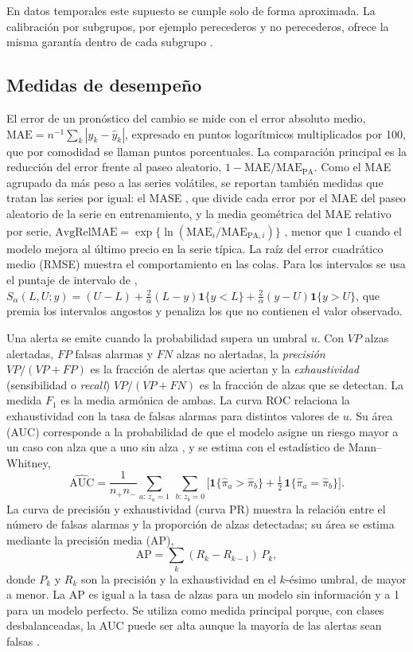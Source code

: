 En datos temporales este supuesto se cumple solo de forma aproximada. La calibración por subgrupos, por ejemplo perecederos y no perecederos, ofrece la misma garantía dentro de cada subgrupo \citep{angelopoulos2023}.

\subsection{Medidas de desempeño}
\label{sec:metricas}

El error de un pronóstico del cambio se mide con el error absoluto medio, $\mathrm{MAE}=n^{-1}\sum_k|y_k-\hat y_k|$, expresado en puntos logarítmicos multiplicados por 100, que por comodidad se llaman puntos porcentuales. La comparación principal es la reducción del error frente al paseo aleatorio, $1-\mathrm{MAE}/\mathrm{MAE}_{\mathrm{PA}}$. Como el MAE agrupado da más peso a las series volátiles, se reportan también medidas que tratan las series por igual: el MASE \citep{hyndman2006}, que divide cada error por el MAE del paseo aleatorio de la serie en entrenamiento, y la media geométrica del MAE relativo por serie, $\mathrm{AvgRelMAE}=\exp\{\overline{\ln(\mathrm{MAE}_i/\mathrm{MAE}_{\mathrm{PA},i})}\}$ \citep{davydenko2013}, menor que 1 cuando el modelo mejora al último precio en la serie típica. La raíz del error cuadrático medio (RMSE) muestra el comportamiento en las colas. Para los intervalos se usa el puntaje de intervalo de \citet{gneiting2007}, $S_\alpha(L,U;y)=(U-L)+\tfrac{2}{\alpha}(L-y)\mathbf{1}\{y<L\}+\tfrac{2}{\alpha}(y-U)\mathbf{1}\{y>U\}$, que premia los intervalos angostos y penaliza los que no contienen el valor observado.

Una alerta se emite cuando la probabilidad supera un umbral $u$. Con $VP$ alzas alertadas, $FP$ falsas alarmas y $FN$ alzas no alertadas, la \emph{precisión} $VP/(VP+FP)$ es la fracción de alertas que aciertan y la \emph{exhaustividad} (sensibilidad o \emph{recall}) $VP/(VP+FN)$ es la fracción de alzas que se detectan. La medida $F_1$ es la media armónica de ambas. La curva ROC relaciona la exhaustividad con la tasa de falsas alarmas para distintos valores de $u$. Su área (AUC) corresponde a la probabilidad de que el modelo asigne un riesgo mayor a un caso con alza que a uno sin alza \citep{hanley1982}, y se estima con el estadístico de Mann--Whitney,
\begin{equation}
\widehat{\mathrm{AUC}}=\frac{1}{n_+n_-}\sum_{a:\,z_a=1}\ \sum_{b:\,z_b=0}\Big[\mathbf{1}\{\hat\pi_a>\hat\pi_b\}+\tfrac12\,\mathbf{1}\{\hat\pi_a=\hat\pi_b\}\Big].
\end{equation}
La curva de precisión y exhaustividad (curva PR) muestra la relación entre el número de falsas alarmas y la proporción de alzas detectadas; su área se estima mediante la precisión media (AP),
\begin{equation}
\mathrm{AP}=\sum_{k}(R_k-R_{k-1})\,P_k,
\end{equation}
donde $P_k$ y $R_k$ son la precisión y la exhaustividad en el $k$-ésimo umbral, de mayor a menor. La AP es igual a la tasa de alzas para un modelo sin información y a 1 para un modelo perfecto. Se utiliza como medida principal porque, con clases desbalanceadas, la AUC puede ser alta aunque la mayoría de las alertas sean falsas \citep{davis2006,saito2015}.

